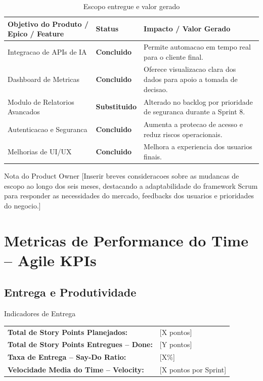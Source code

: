\documentclass[12pt,a4paper]{article}
\newcommand{\statusdone}{\textcolor{SuccessGreen}{\textbf{Concluido}}}
\newcommand{\statusreplaced}{\textcolor{PrimaryBlue}{\textbf{Substituido}}}
\newcommand{\placeholder}[1]{\textcolor{MediumGray}{[#1]}}
\begin{document}
\begin{table}[H]
  \centering
  \caption{Escopo entregue e valor gerado}
  \begin{tabularx}{\textwidth}{@{}Y C{3cm} Y@{}}
    \toprule
    \textbf{Objetivo do Produto / Epico / Feature} & \textbf{Status} & \textbf{Impacto / Valor Gerado} \\
    \midrule
    Integracao de APIs de IA & \statusdone & Permite automacao em tempo real para o cliente final. \\
    Dashboard de Metricas & \statusdone & Oferece visualizacao clara dos dados para apoio a tomada de decisao. \\
    Modulo de Relatorios Avancados & \statusreplaced & Alterado no backlog por prioridade de seguranca durante a Sprint 8. \\
    Autenticacao e Seguranca & \statusdone & Aumenta a protecao de acesso e reduz riscos operacionais. \\
    Melhorias de UI/UX & \statusdone & Melhora a experiencia dos usuarios finais. \\
    \bottomrule
  \end{tabularx}
\end{table}

\begin{notebox}{Nota do Product Owner}
  \placeholder{Inserir breves consideracoes sobre as mudancas de escopo ao longo dos seis meses, destacando a adaptabilidade do framework Scrum para responder as necessidades do mercado, feedbacks dos usuarios e prioridades do negocio.}
\end{notebox}

\section{Metricas de Performance do Time -- Agile KPIs}

\subsection{Entrega e Produtividade}

\begin{infobox}{Indicadores de Entrega}
  \begin{tabularx}{\textwidth}{@{}L{6cm}Y@{}}
    \textbf{Total de Story Points Planejados:} & \placeholder{X pontos} \\
    \textbf{Total de Story Points Entregues -- Done:} & \placeholder{Y pontos} \\
    \textbf{Taxa de Entrega -- Say-Do Ratio:} & \placeholder{X\%} \\
    \textbf{Velocidade Media do Time -- Velocity:} & \placeholder{X pontos por Sprint} \\
  \end{tabularx}
\end{infobox}
\end{document}
